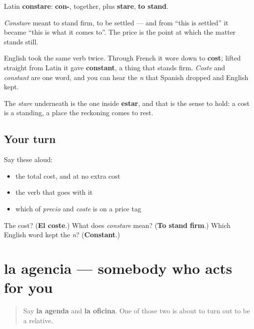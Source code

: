 \begin{cousinweb}
Latin \textbf{constare}: \textbf{con-}, together, plus \textbf{stare}, \textbf{to stand}.

\emph{Constare} meant to stand firm, to be settled — and from \textquotedblleft{}this is settled\textquotedblright{} it became \textquotedblleft{}this is what it comes to\textquotedblright{}. The price is the point at which the matter stands still.

English took the same verb twice. Through French it wore down to \textbf{cost}; lifted straight from Latin it gave \textbf{constant}, a thing that stands firm. \emph{Coste} and \emph{constant} are one word, and you can hear the \emph{n} that Spanish dropped and English kept.

The \emph{stare} underneath is the one inside \textbf{estar}, and that is the sense to hold: a cost is a standing, a place the reckoning comes to rest.
\end{cousinweb}

\subsection*{Your turn}
Say these aloud:

\begin{itemize}
\raggedright
  \item the total cost, and at no extra cost
  \item the verb that goes with it
  \item which of \emph{precio} and \emph{coste} is on a price tag
\end{itemize}

\begin{tcolorbox}[breakable,colback=teal!4,colframe=teal!35!black,title={Before you move on}]
The cost? (\textbf{El coste}.) What does \emph{constare} mean? (\textbf{To stand firm}.) Which English word kept the \emph{n}? (\textbf{Constant}.)
\end{tcolorbox}
\section[la agencia]{la agencia — somebody who acts for you}

\label{lesson:ES-C456-agencia}



\begin{quote}
Say \textbf{la agenda} and \textbf{la oficina}. One of those two is about to turn out to be a relative.
\end{quote}

